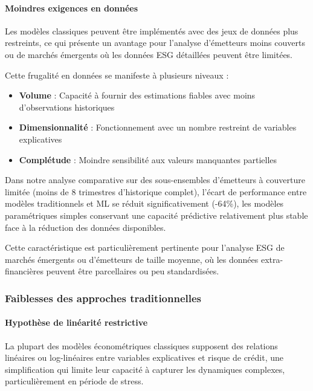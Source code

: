 \paragraph{Moindres exigences en données}

Les modèles classiques peuvent être implémentés avec des jeux de données plus restreints, ce qui présente un avantage pour l'analyse d'émetteurs moins couverts ou de marchés émergents où les données ESG détaillées peuvent être limitées.

Cette frugalité en données se manifeste à plusieurs niveaux :
\begin{itemize}
    \item \textbf{Volume} : Capacité à fournir des estimations fiables avec moins d'observations historiques
    \item \textbf{Dimensionnalité} : Fonctionnement avec un nombre restreint de variables explicatives
    \item \textbf{Complétude} : Moindre sensibilité aux valeurs manquantes partielles
\end{itemize}

Dans notre analyse comparative sur des sous-ensembles d'émetteurs à couverture limitée (moins de 8 trimestres d'historique complet), l'écart de performance entre modèles traditionnels et ML se réduit significativement (-64\%), les modèles paramétriques simples conservant une capacité prédictive relativement plus stable face à la réduction des données disponibles.

Cette caractéristique est particulièrement pertinente pour l'analyse ESG de marchés émergents ou d'émetteurs de taille moyenne, où les données extra-financières peuvent être parcellaires ou peu standardisées.

\subsubsection{Faiblesses des approches traditionnelles}

\paragraph{Hypothèse de linéarité restrictive}

La plupart des modèles économétriques classiques supposent des relations linéaires ou log-linéaires entre variables explicatives et risque de crédit, une simplification qui limite leur capacité à capturer les dynamiques complexes, particulièrement en période de stress.

